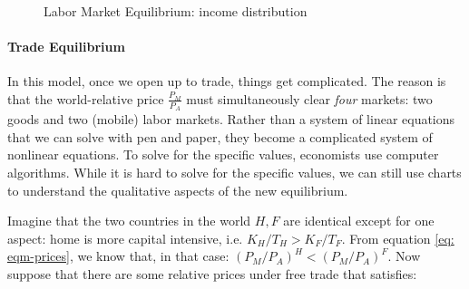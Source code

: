 \documentclass[11pt,letterpaper]{article}
\begin{document}
{\begin{figure}[htp]
    \caption{Labor Market Equilibrium: income distribution}
    \label{fig: lm-income}
\end{figure}


\paragraph{Trade Equilibrium}

In this model, once we open up to trade, things get complicated. The reason is that the world-relative price $\frac{P_M}{P_A}$ must simultaneously clear \emph{four} markets: two goods and two (mobile) labor markets. Rather than a system of linear equations that we can solve with pen and paper, they become a complicated system of nonlinear equations. To solve for the specific values, economists use computer algorithms. While it is hard to solve for the specific values, we can still use charts to understand the qualitative aspects of the new equilibrium.

Imagine that the two countries in the world $H,F$ are identical except for one aspect: home is more capital intensive, i.e. $K_H/T_H > K_F/T_F$. From equation \eqref{eq: eqm-prices}, we know that, in that case: $(P_{M}/P_{A})^{H} < (P_{M}/P_{A})^{F}$. Now suppose that there are some relative prices under free trade that satisfies:

}
\end{document}
